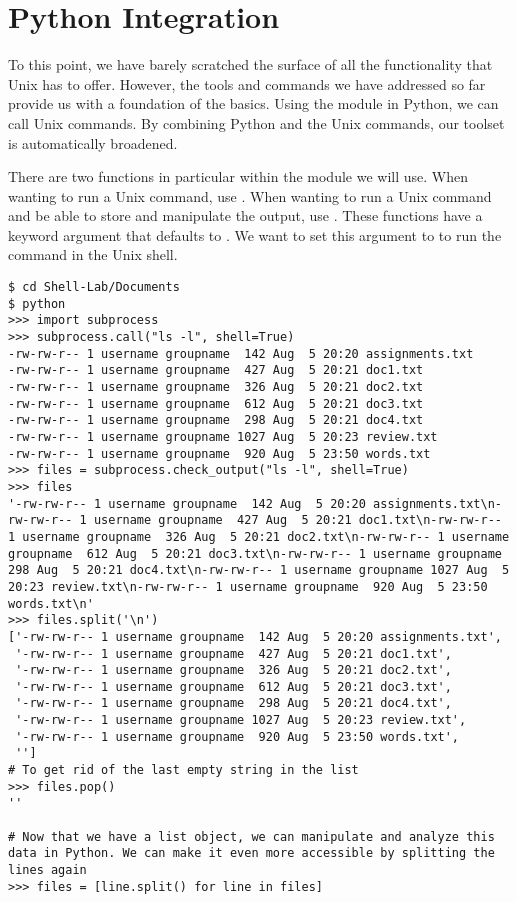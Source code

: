 \section*{Python Integration}
To this point, we have barely scratched the surface of all the functionality that Unix has to offer. However, the tools and commands we have addressed so far provide us with a foundation of the basics. 
Using the  module in Python, we can call Unix commands. By combining Python and the Unix commands, our toolset is automatically broadened.

There are two functions in particular within the  module we will use. When wanting to run a Unix command, use . 
When wanting to run a Unix command and be able to store and manipulate the output, use . 
These functions have a keyword argument  that defaults to . We want to set this argument to  to run the command in the Unix shell.

\begin{lstlisting}
$ cd Shell-Lab/Documents
$ python
>>> import subprocess
>>> subprocess.call("ls -l", shell=True)
-rw-rw-r-- 1 username groupname  142 Aug  5 20:20 assignments.txt
-rw-rw-r-- 1 username groupname  427 Aug  5 20:21 doc1.txt
-rw-rw-r-- 1 username groupname  326 Aug  5 20:21 doc2.txt
-rw-rw-r-- 1 username groupname  612 Aug  5 20:21 doc3.txt
-rw-rw-r-- 1 username groupname  298 Aug  5 20:21 doc4.txt
-rw-rw-r-- 1 username groupname 1027 Aug  5 20:23 review.txt
-rw-rw-r-- 1 username groupname  920 Aug  5 23:50 words.txt
>>> files = subprocess.check_output("ls -l", shell=True)
>>> files
'-rw-rw-r-- 1 username groupname  142 Aug  5 20:20 assignments.txt\n-rw-rw-r-- 1 username groupname  427 Aug  5 20:21 doc1.txt\n-rw-rw-r-- 1 username groupname  326 Aug  5 20:21 doc2.txt\n-rw-rw-r-- 1 username groupname  612 Aug  5 20:21 doc3.txt\n-rw-rw-r-- 1 username groupname  298 Aug  5 20:21 doc4.txt\n-rw-rw-r-- 1 username groupname 1027 Aug  5 20:23 review.txt\n-rw-rw-r-- 1 username groupname  920 Aug  5 23:50 words.txt\n'
>>> files.split('\n')
['-rw-rw-r-- 1 username groupname  142 Aug  5 20:20 assignments.txt',
 '-rw-rw-r-- 1 username groupname  427 Aug  5 20:21 doc1.txt',
 '-rw-rw-r-- 1 username groupname  326 Aug  5 20:21 doc2.txt',
 '-rw-rw-r-- 1 username groupname  612 Aug  5 20:21 doc3.txt',
 '-rw-rw-r-- 1 username groupname  298 Aug  5 20:21 doc4.txt',
 '-rw-rw-r-- 1 username groupname 1027 Aug  5 20:23 review.txt',
 '-rw-rw-r-- 1 username groupname  920 Aug  5 23:50 words.txt',
 '']
# To get rid of the last empty string in the list
>>> files.pop()
''

# Now that we have a list object, we can manipulate and analyze this data in Python. We can make it even more accessible by splitting the lines again
>>> files = [line.split() for line in files]
\end{lstlisting}

